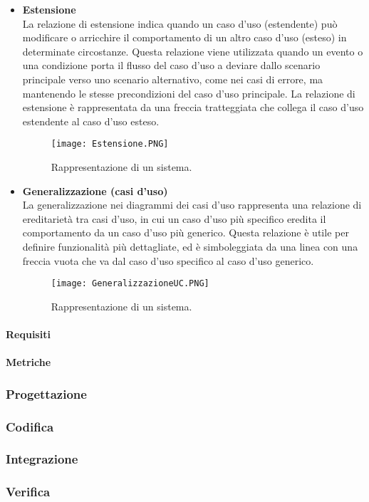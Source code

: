 \begin{itemize}
        \item \textbf{Estensione}\\
        La relazione di estensione indica quando un caso d'uso (estendente) può modificare o arricchire il comportamento di un altro caso d'uso (esteso) in determinate circostanze. Questa relazione viene utilizzata quando un evento o una condizione porta il flusso del caso d'uso a deviare dallo scenario principale verso uno scenario alternativo, come nei casi di errore, ma mantenendo le stesse precondizioni del caso d'uso principale. La relazione di estensione è rappresentata da una freccia tratteggiata che collega il caso d'uso estendente al caso d'uso esteso.
        \begin{figure}[H]
        \centering
        \texttt{[image: Estensione.PNG]}
        \caption{Rappresentazione di un sistema.}
        \end{figure}

        \item \textbf{Generalizzazione (casi d'uso)}\\
        La generalizzazione nei diagrammi dei casi d’uso rappresenta una relazione di ereditarietà tra casi d’uso, in cui un caso d’uso più specifico eredita il comportamento da un caso d’uso più generico. Questa relazione è utile per definire funzionalità più dettagliate, ed è simboleggiata da una linea con una freccia vuota che va dal caso d'uso specifico al caso d'uso generico.
        \begin{figure}[H]
        \centering
        \texttt{[image: GeneralizzazioneUC.PNG]}
        \caption{Rappresentazione di un sistema.}
        \end{figure}
\end{itemize}

\paragraph{Requisiti}

\paragraph{Metriche}

\subsubsection{Progettazione}

\subsubsection{Codifica}

\subsubsection{Integrazione}

\subsubsection{Verifica}



